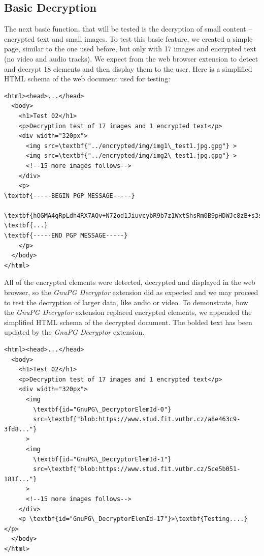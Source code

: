 \subsection{Basic Decryption}
The next basic function, that will be tested is the decryption of small content -- encrypted text and small images. To test this basic feature, we created a simple page, similar to the one used before, but only with 17 images and encrypted text (no video and audio tracks). We expect from the web browser extension to detect and decrypt 18 elements and then display them to the user. Here is a simplified HTML schema of the web document used for testing:

\begin{Verbatim}[commandchars=\\\{\},codes={\catcode`$=3\catcode`_=8},samepage=false,frame=single]
<html><head>...</head>
  <body>
    <h1>Test 02</h1>
    <p>Decryption test of 17 images and 1 encrypted text</p>
    <div width="320px">
      <img src=\textbf{"../encrypted/img/img1\_test1.jpg.gpg"} >
      <img src=\textbf{"../encrypted/img/img2\_test1.jpg.gpg"} >
      <!--15 more images follows-->
    </div>
    <p>
\textbf{-----BEGIN PGP MESSAGE-----}

\textbf{hQGMA4gRpLdh4RX7AQv+N72od1JiuvcybR9b7z1WxtShsRm0B9pHDWJc8zB+s3sk}
\textbf{...}
\textbf{-----END PGP MESSAGE-----}
    </p>
  </body>
</html>
\end{Verbatim}

All of the encrypted elements were detected, decrypted and displayed in the web browser, so the \textit{GnuPG Decryptor} extension did as expected and we may proceed to test the decryption of larger data, like audio or video. To demonstrate, how the \textit{GnuPG Decryptor} extension replaced encrypted elements, we appended the simplified HTML schema of the decrypted document. The bolded text has been updated by the \textit{GnuPG Decryptor} extension.

\begin{Verbatim}[commandchars=\\\{\},codes={\catcode`$=3\catcode`_=8},samepage=false,frame=single]
<html><head>...</head>
  <body>
    <h1>Test 02</h1>
    <p>Decryption test of 17 images and 1 encrypted text</p>
    <div width="320px">
      <img
        \textbf{id="GnuPG\_DecryptorElemId-0"}
        src=\textbf{"blob:https://www.stud.fit.vutbr.cz/a8e463c9-3fd8..."}
      >
      <img
        \textbf{id="GnuPG\_DecryptorElemId-1"}
        src=\textbf{"blob:https://www.stud.fit.vutbr.cz/5ce5b051-181f..."}
      >
      <!--15 more images follows-->
    </div>
    <p \textbf{id="GnuPG\_DecryptorElemId-17"}>\textbf{Testing....}</p>
  </body>
</html>
\end{Verbatim}

